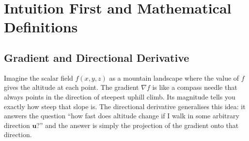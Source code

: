 \documentclass[12pt,a4paper]{article}
\begin{document}
\section{Intuition First and Mathematical Definitions}

\subsection{Gradient and Directional Derivative}

Imagine the scalar field $f(x,y,z)$ as a mountain landscape where the value of $f$ gives the altitude at each point. The gradient $\nabla f$ is like a compass needle that always points in the direction of steepest uphill climb. Its magnitude tells you exactly how steep that slope is. The directional derivative generalises this idea: it answers the question ``how fast does altitude change if I walk in some arbitrary direction $\mathbf{u}$?'' and the answer is simply the projection of the gradient onto that direction.
\end{document}
